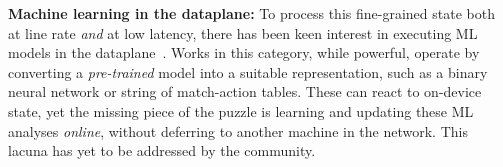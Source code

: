 \documentclass[
sigconf,natbib=false
]{acmart}
\newcommand{\fakepara}[1]{\noindent\textbf{#1:}}
\begin{document}


%
\fakepara{Machine learning in the dataplane}
To process this fine-grained state both at line rate \emph{and} at low latency, there has been keen interest in executing ML models in the dataplane~\parencite{DBLP:conf/hotnets/XiongZ19,DBLP:journals/corr/abs-2009-02353}.
Works in this category, while powerful, operate by converting a \emph{pre-trained} model into a suitable representation, such as a binary neural network or string of match-action tables.
These can react to on-device state, yet the missing piece of the puzzle is learning and updating these ML analyses \emph{online}, without deferring to another machine in the network.
This lacuna has yet to be addressed by the community.
\end{document}
